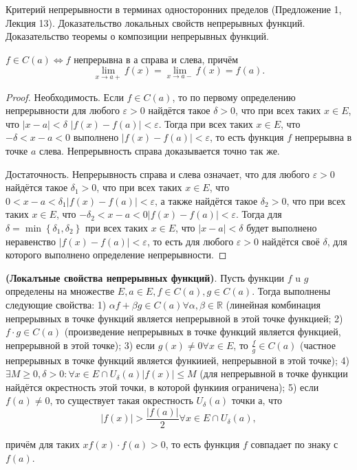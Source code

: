 \begin{problem}
Критерий непрерывности в терминах односторонних пределов (Предложение 1, Лекция
13). Доказательство локальных свойств непрерывных функций. Доказательство теоремы
о композиции непрерывных функций.
\end{problem}
\begin{proposition}
    $f \in C(a) \Leftrightarrow f$ непрерывна в а справа и слева, причём
    $$
        \lim _{x \rightarrow a+} f(x)=\lim _{x \rightarrow a-} f(x)=f(a) .
    $$
\end{proposition}

\begin{proof}
    Необходимость. Если $f \in C(a)$, то по первому определению непрерывности для любого $\varepsilon>0$ найдётся такое $\delta>0$, что при всех таких $x \in E$, что $|x-a|<\delta$ $|f(x)-f(a)|<\varepsilon$. Тогда при всех таких $x \in E$, что $-\delta<x-a<0$ выполнено $|f(x)-f(a)|<\varepsilon$, то есть функция $f$ непрерывна в точке $a$ слева. Непрерывность справа доказывается точно так же.

    Достаточность. Непрерывность справа и слева означает, что для любого $\varepsilon>0$ найдётся такое $\delta_1>0$, что при всех таких $x \in E$, что $0<x-a<\delta_1|f(x)-f(a)|<\varepsilon$, а также найдётся такое $\delta_2>0$, что при всех таких $x \in E$, что $-\delta_2<x-a<0|f(x)-f(a)|<\varepsilon$. Тогда для $\delta=\min \left\{\delta_1, \delta_2\right\}$ при всех таких $x \in E$, что $|x-a|<\delta$ будет выполнено неравенство $|f(x)-f(a)|<\varepsilon$, то есть для любого $\varepsilon>0$ найдётся своё $\delta$, для которого выполнено определение непрерывности.
\end{proof}

\begin{proposition}
    \textbf{(Локалъные свойства непрерывных функций)}. Пусть функции $f$ u $g$ определены на множестве $E, a \in E, f \in C(a), g \in C(a)$. Тогда выполнены следующие свойства:
    1) $\alpha f+\beta g \in C(a) \forall \alpha, \beta \in \mathbb{R}$ (линейная комбинация непрерывных в точке функций является непрерывной в этой точке функцией;
    2) $f \cdot g \in C(a)$ (произведение непрерывных в точке функций является функцией, непрерывной в этой точке);
    3) если $g(x) \neq 0 \forall x \in E$, то $\frac{f}{g} \in C(a)$ (частное непрерывных в точке функций является функиией, непрерывной в этой точке);
    4) $\exists M \geq 0, \delta>0: \forall x \in E \cap U_\delta(a)|f(x)| \leq M$ (для непрерывной в точке функции найдётся окрестность этой точки, в которой функиия ограничена);
    5) если $f(a) \neq 0$, то существует такая окрестность $U_\delta(a)$ точки $а$, что
    $$
        |f(x)|>\frac{|f(a)|}{2} \forall x \in E \cap U_\delta(a),
    $$

    причём для таких $x f(x) \cdot f(a)>0$, то есть функция $f$ совпадает по знаку с $f(a)$.
\end{proposition}

